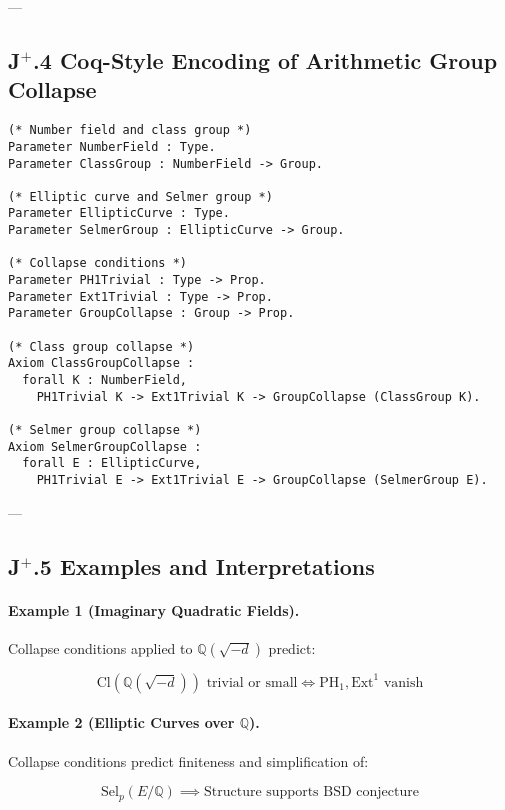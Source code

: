 \documentclass[11pt]{article}
\begin{document}
---

\subsection*{J$^{+}$.4 Coq-Style Encoding of Arithmetic Group Collapse}

\begin{lstlisting}[language=Coq]
(* Number field and class group *)
Parameter NumberField : Type.
Parameter ClassGroup : NumberField -> Group.

(* Elliptic curve and Selmer group *)
Parameter EllipticCurve : Type.
Parameter SelmerGroup : EllipticCurve -> Group.

(* Collapse conditions *)
Parameter PH1Trivial : Type -> Prop.
Parameter Ext1Trivial : Type -> Prop.
Parameter GroupCollapse : Group -> Prop.

(* Class group collapse *)
Axiom ClassGroupCollapse :
  forall K : NumberField,
    PH1Trivial K -> Ext1Trivial K -> GroupCollapse (ClassGroup K).

(* Selmer group collapse *)
Axiom SelmerGroupCollapse :
  forall E : EllipticCurve,
    PH1Trivial E -> Ext1Trivial E -> GroupCollapse (SelmerGroup E).
\end{lstlisting}

---

\subsection*{J$^{+}$.5 Examples and Interpretations}

\paragraph{Example 1 (Imaginary Quadratic Fields).}

Collapse conditions applied to $\mathbb{Q}(\sqrt{-d})$ predict:

\[
\mathrm{Cl}(\mathbb{Q}(\sqrt{-d})) \text{ trivial or small} \iff \mathrm{PH}_1, \mathrm{Ext}^1 \text{ vanish}
\]

\paragraph{Example 2 (Elliptic Curves over $\mathbb{Q}$).}

Collapse conditions predict finiteness and simplification of:

\[
\mathrm{Sel}_p(E/\mathbb{Q}) \implies \text{Structure supports BSD conjecture}
\]
\end{document}
